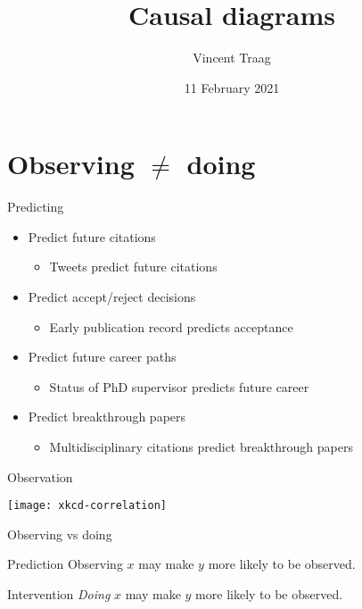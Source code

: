 \documentclass[aspectratio=169,notes=hide,compress]{beamer}
\title{Causal diagrams}
\author{Vincent Traag}
\date{11 February 2021}
\institute{WTMC method track -- Computational methods \& modelling}
\begin{document}
\frame{\titlepage}

\frame{\tableofcontents}

\section{Observing $\neq$ doing}

\begin{frame}[t]{Predicting}

  \begin{itemize}
    \item<+-> Predict future citations
    \begin{itemize}
      \item<+-> Tweets predict future citations
    \end{itemize}
    \item<+-> Predict accept/reject decisions
    \begin{itemize}
      \item<+-> Early publication record predicts acceptance
    \end{itemize}
    \item<+-> Predict future career paths
    \begin{itemize}
      \item<+-> Status of PhD supervisor predicts future career
    \end{itemize}
    \item<+-> Predict breakthrough papers
    \begin{itemize}
      \item<+-> Multidisciplinary citations predict breakthrough papers
    \end{itemize}
  \end{itemize}

  \vskip1cm
\end{frame}

\begin{frame}{Observation}

  \centering
  \texttt{[image: xkcd-correlation]}

\end{frame}

\begin{frame}[c]{Observing vs doing}

  \begin{block}{Prediction}
    Observing $x$ may make $y$ more likely to be observed.
  \end{block}

  \vskip2cm
  \pause
  \begin{block}{Intervention}
    \emph{Doing} $x$ may make $y$ more likely to be observed.
  \end{block}

\end{frame}
\end{document}
